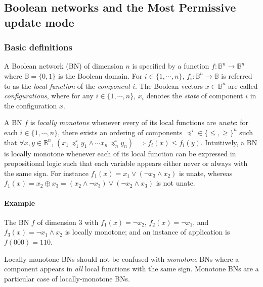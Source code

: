 \documentclass[PCJ,Unicode,screen,mode=plain]{cedram}
\begin{document}
\hypertarget{boolean-networks-and-the-most-permissive-update-mode}{%
\subsection{Boolean networks and the Most Permissive update
mode}\label{boolean-networks-and-the-most-permissive-update-mode}}

\hypertarget{basic-definitions}{%
\subsubsection{Basic definitions}\label{basic-definitions}}

A Boolean network (BN) of dimension \(n\) is specified by a function
\(f: \mathbb B^n\to\mathbb B^n\) where \(\mathbb B = \{0,1\}\) is the
Boolean domain. For \(i\in \{1,\cdots,n\}\),
\(f_i:\mathbb B^n\to\mathbb B\) is referred to as the \emph{local
function} of the \emph{component} \(i\). The Boolean vectors
\(x\in\mathbb B^n\) are called \emph{configurations}, where for any
\(i\in\{1,\cdots,n\}\), \(x_i\) denotes the \emph{state} of component
\(i\) in the configuration \(x\).

A BN \(f\) is \emph{locally monotone} whenever every of its local
functions are \emph{unate}: for each \(i\in\{1,\cdots,n\}\), there
exists an ordering of components \(\preceq^i\in \{\leq, \geq\}^n\) such
that \(\forall x,y\in \mathbb B^n\),
\((x_1\preceq^i_1 y_1 \wedge \cdots x_n\preceq^i_n y_n) \implies f_i(x) \leq f_i(y)\).
Intuitively, a BN is locally monotone whenever each of its local
function can be expressed in propositional logic such that each variable
appears either never or always with the same sign. For instance
\(f_1(x) = x_1\vee (\neg x_3 \wedge x_2)\) is unate, whereas
\(f_1(x) = x_2 \oplus x_3 = (x_2\wedge\neg x_3)\vee (\neg x_2\wedge x_3)\)
is not unate.

\paragraph{Example}

The BN \(f\) of dimension \(3\) with \(f_1(x)=\neg x_2\),
\(f_2(x)=\neg x_1\), and \(f_3(x) = \neg x_1\wedge x_2\) is locally
monotone; and an instance of application is \(f(000)=110\).

Locally monotone BNs should not be confused with \emph{monotone} BNs
where a component appears in \emph{all} local functions with the same
sign. Monotone BNs are a particular case of locally-monotone BNs.
\end{document}
